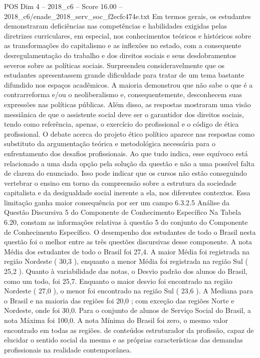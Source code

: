 \begin{textsample}{POS Dim 4 – 2018\_c6 – Score 16.00 – 2018\_c6/enade\_2018\_serv\_soc\_f2ecfc474e.txt}
Em termos gerais, os estudantes demonstraram deficiências nas competências e habilidades exigidas pelas diretrizes curriculares, em especial, nos conhecimentos teóricos e históricos sobre as transformações do capitalismo e as inflexões no estado, com a consequente desregulamentação do trabalho e dos direitos sociais e seus desdobramentos severos sobre as políticas sociais.
Surpreendeu consideravelmente que os estudantes apresentassem grande dificuldade para tratar de um tema bastante difundido nos espaços acadêmicos.
A maioria demonstrou que não sabe o que é a contrarreforma e/ou o neoliberalismo e, consequentemente, desconhecem suas expressões nas políticas públicas.
Além disso, as respostas mostraram uma visão messiânica de que o assistente social deve ser o garantidor dos direitos sociais, tendo como referência, apenas, o exercício do profissional e o código de ética profissional.
O debate acerca do projeto ético político aparece nas respostas como substituto da argumentação teórica e metodológica necessária para o enfrentamento dos desafios profissionais.
Ao que tudo indica, esse equívoco está relacionado a uma dada opção pela solução da questão e não a uma possível falta de clareza do enunciado.
Isso pode indicar que os cursos não estão conseguindo vertebrar o ensino em torno da compreensão sobre a estrutura da sociedade capitalista e da desigualdade social inerente a ela, nos diferentes contextos.
Essa limitação ganha maior consequência por ser um campo 6.3.2.5 Análise da Questão Discursiva 5 do Componente de Conhecimento Específico Na Tabela 6.20, constam as informações relativas à questão 5 do conjunto do Componente de Conhecimento Específico.
O desempenho dos estudantes de todo o Brasil nesta questão foi o melhor entre as três questões discursivas desse componente.
A nota Média dos estudantes de todo o Brasil foi 27,4.
A maior Média foi registrada na região Nordeste ( 30,3 ), enquanto a menor Média foi registrada na região Sul ( 25,2 ).
Quanto à variabilidade das notas, o Desvio padrão dos alunos do Brasil, como um todo, foi 25,7.
Enquanto o maior desvio foi encontrado na região Nordeste ( 27,0 ), o menor foi encontrado na região Sul ( 23,6 ).
A Mediana para o Brasil e na maioria das regiões foi 20,0 ; com exceção das regiões Norte e Nordeste, onde foi 30,0.
Para o conjunto de alunos de Serviço Social do Brasil, a nota Máxima foi 100,0.
A nota Mínima do Brasil foi zero, o mesmo valor encontrado em todas as regiões. de conteúdos estruturador da profissão, capaz de elucidar o sentido social da mesma e as próprias características das demandas profissionais na realidade contemporânea.

\end{textsample}
